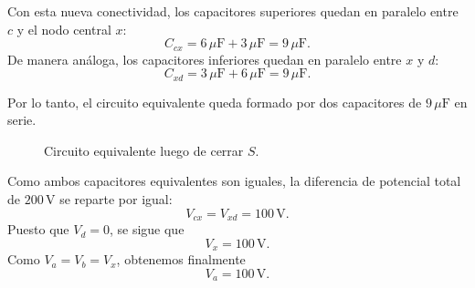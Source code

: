 \documentclass[11pt]{article}
\begin{document}
Con esta nueva conectividad, los capacitores superiores quedan en paralelo entre $c$ y el nodo central $x$:
\begin{equation*}
    C_{cx}=6\,\mu\text{F}+3\,\mu\text{F}=9\,\mu\text{F}.
\end{equation*}
De manera an\'aloga, los capacitores inferiores quedan en paralelo entre $x$ y $d$:
\begin{equation*}
    C_{xd}=3\,\mu\text{F}+6\,\mu\text{F}=9\,\mu\text{F}.
\end{equation*}

Por lo tanto, el circuito equivalente queda formado por dos capacitores de $9\,\mu\text{F}$ en serie.

\begin{figure}[h!]
    \centering
    \caption{Circuito equivalente luego de cerrar $S$.}
\end{figure}

Como ambos capacitores equivalentes son iguales, la diferencia de potencial total de $200\,\text{V}$ se reparte por igual:
\begin{equation*}
    V_{cx}=V_{xd}=100\,\text{V}.
\end{equation*}
Puesto que $V_d=0$, se sigue que
\begin{equation*}
    V_x=100\,\text{V}.
\end{equation*}
Como $V_a=V_b=V_x$, obtenemos finalmente
\begin{equation*}
    \boxed{V_a=100\,\text{V}}.
\end{equation*}
\end{document}

